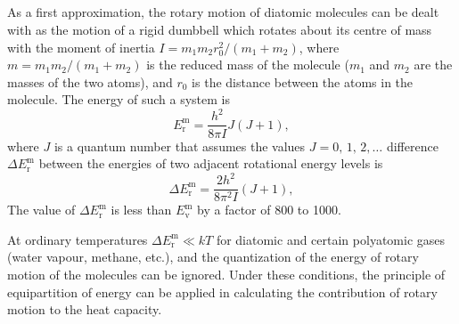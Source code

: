 \subsection{}\label{10.7.5} As a first approximation, the rotary motion of diatomic molecules can be dealt with as the motion of a rigid dumbbell which rotates about its centre of mass with the moment of inertia $I = m_{1}m_{2}r_{0}^{2}/(m_{1} + m_{2})$, where $m = m_{1}m_{2}/(m_{1}+ m_{2})$ is the reduced mass of the molecule ($m_{1}$ and $m_{2}$ are the masses of the two atoms), and $r_{0}$ is the distance between the atoms in the molecule. The energy of such a system is
\begin{equation*}%
E^{\text{m}}_{\text{r}} = \frac{h^{2}}{8 \pi I} J (J+1),
\end{equation*}
where $J$ is a quantum number that assumes the values $J = 0, \,1,\, 2, \ldots$ difference $\Delta E^{\text{m}}_{\text{r}}$ between the energies of two adjacent rotational energy levels is
\begin{equation*}%
\Delta E^{\text{m}}_{\text{r}} = \frac{2h^{2}}{8 \pi^{2} I} (J+1),
\end{equation*}
The value of $\Delta E^{\text{m}}_{\text{r}}$ is less than $E^{\text{m}}_{\text{v}}$ by a factor of 800 to 1000.

At ordinary temperatures $\Delta E^{\text{m}}_{\text{r}} \ll kT$ for diatomic and certain polyatomic gases (water vapour, methane, etc.), and the quantization of the energy of rotary motion of the molecules can be ignored. Under these conditions, the principle of equipartition of energy  can be applied in calculating the contri­bution of rotary motion to the heat capacity.

